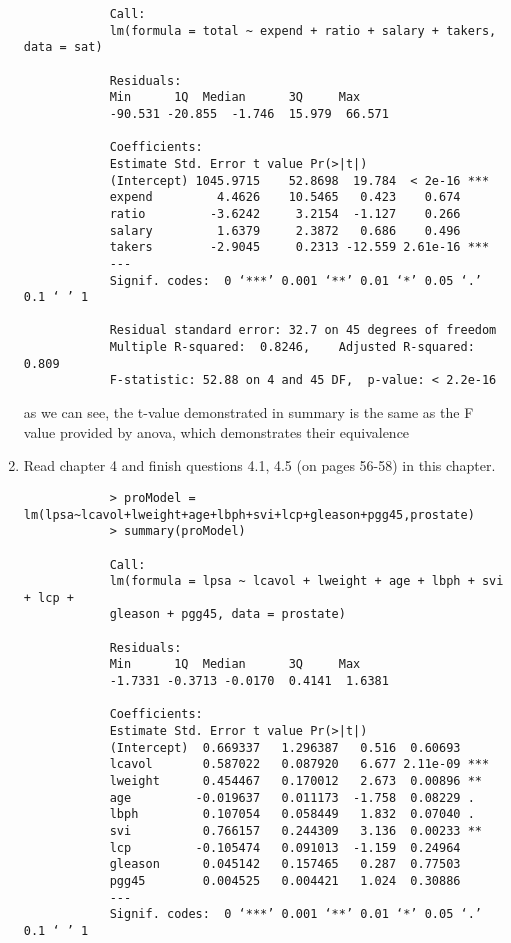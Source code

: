 \documentclass[12pt]{article}
\begin{document}
\begin{enumerate}
\begin{verbatim}
			Call:
			lm(formula = total ~ expend + ratio + salary + takers, data = sat)
			
			Residuals:
			Min      1Q  Median      3Q     Max 
			-90.531 -20.855  -1.746  15.979  66.571 
			
			Coefficients:
			Estimate Std. Error t value Pr(>|t|)    
			(Intercept) 1045.9715    52.8698  19.784  < 2e-16 ***
			expend         4.4626    10.5465   0.423    0.674    
			ratio         -3.6242     3.2154  -1.127    0.266    
			salary         1.6379     2.3872   0.686    0.496    
			takers        -2.9045     0.2313 -12.559 2.61e-16 ***
			---
			Signif. codes:  0 ‘***’ 0.001 ‘**’ 0.01 ‘*’ 0.05 ‘.’ 0.1 ‘ ’ 1
			
			Residual standard error: 32.7 on 45 degrees of freedom
			Multiple R-squared:  0.8246,	Adjusted R-squared:  0.809 
			F-statistic: 52.88 on 4 and 45 DF,  p-value: < 2.2e-16
		\end{verbatim}
		
		as we can see, the t-value demonstrated in summary is the same as the F value provided by anova, which demonstrates their equivalence
		\item Read chapter 4 and finish questions 4.1, 4.5  (on pages 56-58) in this chapter.
		\begin{verbatim}
			> proModel = lm(lpsa~lcavol+lweight+age+lbph+svi+lcp+gleason+pgg45,prostate)
			> summary(proModel)
			
			Call:
			lm(formula = lpsa ~ lcavol + lweight + age + lbph + svi + lcp + 
			gleason + pgg45, data = prostate)
			
			Residuals:
			Min      1Q  Median      3Q     Max 
			-1.7331 -0.3713 -0.0170  0.4141  1.6381 
			
			Coefficients:
			Estimate Std. Error t value Pr(>|t|)    
			(Intercept)  0.669337   1.296387   0.516  0.60693    
			lcavol       0.587022   0.087920   6.677 2.11e-09 ***
			lweight      0.454467   0.170012   2.673  0.00896 ** 
			age         -0.019637   0.011173  -1.758  0.08229 .  
			lbph         0.107054   0.058449   1.832  0.07040 .  
			svi          0.766157   0.244309   3.136  0.00233 ** 
			lcp         -0.105474   0.091013  -1.159  0.24964    
			gleason      0.045142   0.157465   0.287  0.77503    
			pgg45        0.004525   0.004421   1.024  0.30886    
			---
			Signif. codes:  0 ‘***’ 0.001 ‘**’ 0.01 ‘*’ 0.05 ‘.’ 0.1 ‘ ’ 1
			

\end{verbatim}
\end{enumerate}
\end{document}
